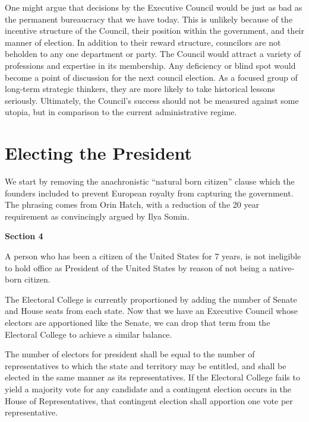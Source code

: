 \documentclass{article}
\newcommand{\quotes}[1]{``#1''}
\begin{document}
One might argue that decisions by the Executive Council would be just as bad as the permanent bureaucracy that we have today. This is unlikely because of the incentive structure of the Council, their position within the government, and their manner of election. In addition to their reward structure, councilors are not beholden to any one department or party. The Council would attract a variety of professions and expertise in its membership. Any deficiency or blind spot would become a point of discussion for the next council election. As a focused group of long-term strategic thinkers, they are more likely to take historical lessons seriously. Ultimately, the Council's success should not be measured against some utopia, but in comparison to the current administrative regime.

\section{Electing the President}

We start by removing the anachronistic \quotes{natural born citizen} clause which the founders included to prevent European royalty from capturing the government. The phrasing comes from Orin Hatch\cite{Somin_Hatch}, with a reduction of the 20 year requirement as convincingly argued by Ilya Somin\cite{Somin_NBC}.

\begin{quoting}
\textbf{Section 4}

A person who has been a citizen of the United States for 7 years, is not ineligible to hold office as President of the United States by reason of not being a native-born citizen.
\end{quoting}

The Electoral College is currently proportioned by adding the number of Senate and House seats from each state. Now that we have an Executive Council whose electors are apportioned like the Senate, we can drop that term from the Electoral College to achieve a similar balance.

\begin{quoting}
The number of electors for president shall be equal to the number of representatives to which the state and territory may be entitled, and shall be elected in the same manner as its representatives. If the Electoral College fails to yield a majority vote for any candidate and a contingent election occurs in the House of Representatives, that contingent election shall apportion one vote per representative.
\end{quoting}
\end{document}
